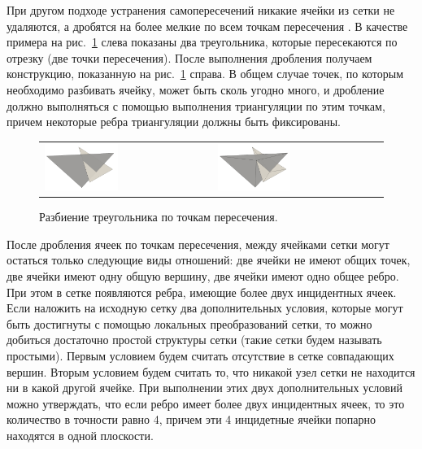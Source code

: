 При другом подходе устранения самопересечений никакие ячейки из сетки не удаляются, а дробятся на более мелкие по всем точкам пересечения \cite{Skorkovska2018Int}.
В качестве примера на рис.~\ref{fig:text_1_int_tri_cut} слева показаны два треугольника, которые пересекаются по отрезку (две точки пересечения).
После выполнения дробления получаем конструкцию, показанную на рис.~\ref{fig:text_1_int_tri_cut} справа.
В общем случае точек, по которым необходимо разбивать ячейку, может быть сколь угодно много, и дробление должно выполняться с помощью выполнения триангуляции по этим точкам, причем некоторые ребра триангуляции должны быть фиксированы.

\begin{figure}[h]
\centering
\begin{tabular}{ll}
\includegraphics[width=0.45\textwidth]{./pics/text_1_int/pic_before_cut.png}
&
\includegraphics[width=0.45\textwidth]{./pics/text_1_int/pic_after_cut.png}
\end{tabular}
\caption{Разбиение треугольника по точкам пересечения.}
\label{fig:text_1_int_tri_cut}
\end{figure}

После дробления ячеек по точкам пересечения, между ячейками сетки могут остаться только следующие виды отношений: две ячейки не имеют общих точек, две ячейки имеют одну общую вершину, две ячейки имеют одно общее ребро.
При этом в сетке появляются ребра, имеющие более двух инцидентных ячеек.
Если наложить на исходную сетку два дополнительных условия, которые могут быть достигнуты с помощью локальных преобразований сетки, то можно добиться достаточно простой структуры сетки (такие сетки будем называть простыми).
Первым условием будем считать отсутствие в сетке совпадающих вершин.
Вторым условием будем считать то, что никакой узел сетки не находится ни в какой другой ячейке.
При выполнении этих двух дополнительных условий можно утверждать, что если ребро имеет более двух инцидентных ячеек, то это количество в точности равно 4, причем эти 4 инцидетные ячейки попарно находятся в одной плоскости.

